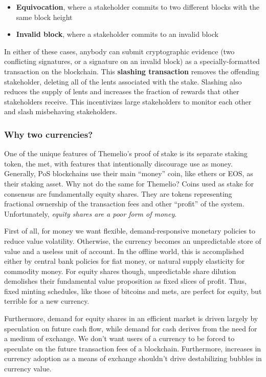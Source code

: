\documentclass[headinclude]{scrbook}
\begin{document}
\begin{itemize}
    \item \textbf{Equivocation}, where a stakeholder commits to two different blocks with the same block height
    \item \textbf{Invalid block}, where a stakeholder commits to an invalid block
\end{itemize}

In either of these cases, anybody can submit cryptographic evidence (two conflicting signatures, or a signature on an invalid block) as a specially-formatted transaction on the blockchain. This \textbf{slashing transaction} removes the offending stakeholder, deleting all of the lents associated with the stake. Slashing also reduces the supply of lents and increases the fraction of rewards that other stakeholders receive. This incentivizes large stakeholders to monitor each other and slash misbehaving stakeholders.

\subsubsection{Why two currencies?}

One of the unique features of Themelio's proof of stake is its separate staking token, the met, with features that intentionally discourage use as money. Generally, PoS blockchains use their main ``money'' coin, like ethers or EOS, as their staking asset. Why not do the same for Themelio? Coins used as stake for consensus are fundamentally equity shares. They are tokens representing fractional ownership of the transaction fees and other ``profit'' of the system. Unfortunately, \emph{equity shares are a poor form of money}.

First of all, for money we want flexible, demand-responsive monetary policies to reduce value volatility. Otherwise, the currency becomes an unpredictable store of value and a useless unit of account. In the offline world, this is accomplished either by central bank policies for fiat money, or natural supply elasticity for commodity money. For equity shares though, unpredictable share dilution demolishes their fundamental value proposition as fixed slices of profit. Thus, fixed minting schedules, like those of bitcoins and mets, are perfect for equity, but terrible for a new currency.

Furthermore, demand for equity shares in an efficient market is driven largely by speculation on future cash flow, while demand for cash derives from the need for a medium of exchange. We don't want users of a currency to be forced to speculate on the future transaction fees of a blockchain. Furthermore, increases in currency adoption as a means of exchange shouldn't drive destabilizing bubbles in currency value.
\end{document}
